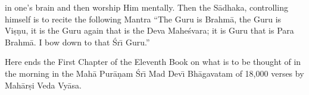 in one's brain and then worship Him mentally. Then the S\=adhaka, controlling himself is to recite the following Mantra ``The Guru is Brahm\=a, the Guru is Vi\d{s}\d{n}u, it is the Guru again that is the Deva Mahe\'svara; it is Guru that is Para Brahm\=a. I bow down to that \'Sr\={\i} Guru.''

Here ends the First Chapter of the Eleventh Book on what is to be thought of in the morning in the Mah\=a Pur\=a\d{n}am \'Sr\={\i} Mad Dev\={\i} Bh\=agavatam of 18,000 verses by Mah\=ar\d{s}i Veda Vy\=asa.




